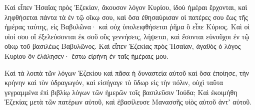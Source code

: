 {Καὶ εἶπεν Ἡσαΐας πρὸς Ἐζεκίαν, ἄκουσον λόγον Κυρίου,
ἰδοὺ ἡμέραι ἔρχονται, καὶ ληφθήσεται πάντα τὰ ἐν τῷ οἴκῳ σου, καὶ ὅσα ἐθησαύρισαν οἱ πατέρες σου ἕως τῆς ἡμέρας ταύτης, εἰς Βαβυλῶνα· καὶ οὐχ ὑπολειφθήσεται ῥῆμα ὃ εἶπε Κύριος.
Καὶ οἱ υἱοί σου οἳ ἐξελεύσονται ἐκ σοῦ οὓς γεννήσεις, λήψεται, καὶ ἔσονται εὐνοῦχοι ἐν τῷ οἴκῳ τοῦ βασιλέως Βαβυλῶνος.
Καὶ εἶπεν Ἐζεκίας πρὸς Ἡσαΐαν, ἀγαθὸς ὁ λόγος Κυρίου ὃν ἐλάλησεν· ἔστω εἰρήνη ἐν ταῖς ἡμέραις μου.
\par }{\PP {}Καὶ τὰ λοιπὰ τῶν λόγων Ἐζεκίου καὶ πᾶσα ἡ δυναστεία αὐτοῦ καὶ ὅσα ἐποίησε, τὴν κρήνην καὶ τὸν ὑδραγωγόν, καὶ εἰσήγαγε τὸ ὕδωρ εἰς τὴν πόλιν, οὐχὶ ταῦτα γεγραμμένα ἐπὶ βιβλίῳ λόγων τῶν ἡμερῶν τοῖς βασιλεῦσιν Ἰούδα;
Καὶ ἐκοιμήθη Ἐζεκίας μετὰ τῶν πατέρων αὐτοῦ, καὶ ἐβασίλευσε Μανασσῆς υἱὸς αὐτοῦ ἀντʼ αὐτοῦ.

}
